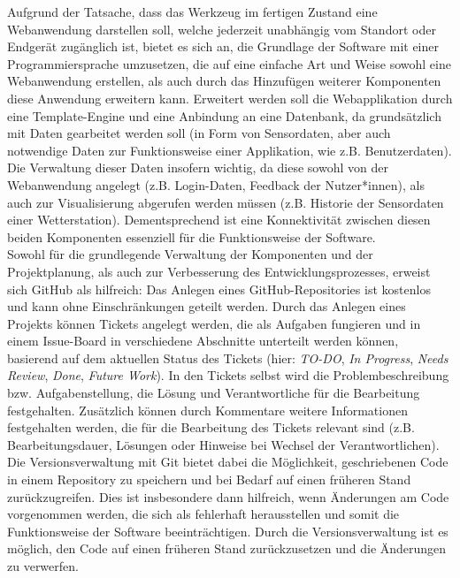 Aufgrund der Tatsache, dass das Werkzeug im fertigen Zustand eine Webanwendung darstellen soll, welche jederzeit unabhängig vom Standort oder Endgerät zugänglich ist, bietet es sich an, die Grundlage der Software mit einer Programmiersprache umzusetzen, die auf eine einfache Art und Weise sowohl eine Webanwendung erstellen, als auch durch das Hinzufügen weiterer Komponenten diese Anwendung erweitern kann. Erweitert werden soll die Webapplikation durch eine Template-Engine und eine Anbindung an eine Datenbank, da grundsätzlich mit Daten gearbeitet werden soll (in Form von Sensordaten, aber auch notwendige Daten zur Funktionsweise einer Applikation, wie z.B. Benutzerdaten). Die Verwaltung dieser Daten insofern wichtig, da diese sowohl von der Webanwendung angelegt (z.B. Login-Daten, Feedback der Nutzer*innen), als auch zur Visualisierung abgerufen werden müssen (z.B. Historie der Sensordaten einer Wetterstation). Dementsprechend ist eine Konnektivität zwischen diesen beiden Komponenten essenziell für die Funktionsweise der Software. \\ Sowohl für die grundlegende Verwaltung der Komponenten und der Projektplanung, als auch zur Verbesserung des Entwicklungsprozesses, erweist sich GitHub als hilfreich: Das Anlegen eines GitHub-Repositories ist kostenlos und kann ohne Einschränkungen geteilt werden. Durch das Anlegen eines Projekts können Tickets angelegt werden, die als Aufgaben fungieren und in einem Issue-Board in verschiedene Abschnitte unterteilt werden können, basierend auf dem aktuellen Status des Tickets (hier: \textit{TO-DO}, \textit{In Progress}, \textit{Needs Review}, \textit{Done}, \textit{Future Work}). In den Tickets selbst wird die Problembeschreibung bzw. Aufgabenstellung, die Lösung und Verantwortliche für die Bearbeitung festgehalten. Zusätzlich können durch Kommentare weitere Informationen festgehalten werden, die für die Bearbeitung des Tickets relevant sind (z.B. Bearbeitungsdauer, Lösungen oder Hinweise bei Wechsel der Verantwortlichen). \\ Die Versionsverwaltung mit Git bietet dabei die Möglichkeit, geschriebenen Code in einem Repository zu speichern und bei Bedarf auf einen früheren Stand zurückzugreifen. Dies ist insbesondere dann hilfreich, wenn Änderungen am Code vorgenommen werden, die sich als fehlerhaft herausstellen und somit die Funktionsweise der Software beeinträchtigen. Durch die Versionsverwaltung ist es möglich, den Code auf einen früheren Stand zurückzusetzen und die Änderungen zu verwerfen. 

